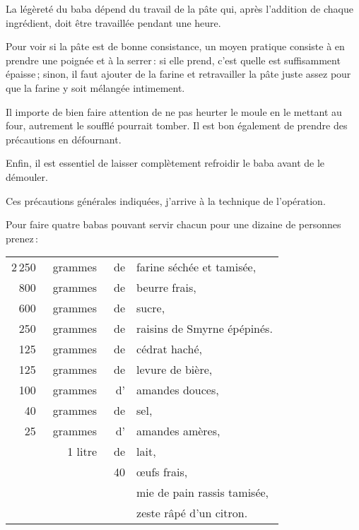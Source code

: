 La légèreté du baba dépend du travail de la pâte qui, après l'addition de
chaque ingrédient, doit être travaillée pendant une heure.

Pour voir si la pâte est de bonne consistance, un moyen pratique consiste à en
prendre une poignée et à la serrer : si elle prend, c'est quelle est
suffisamment épaisse ; sinon, il faut ajouter de la farine et retravailler la
pâte juste assez pour que la farine y soit mélangée intimement.

Il importe de bien faire attention de ne pas heurter le moule en le mettant au
four, autrement le soufflé pourrait tomber. Il est bon également de prendre des
précautions en défournant.

Enfin, il est essentiel de laisser complètement refroidir le baba avant de le
démouler.

Ces précautions générales indiquées, j'arrive à la technique de l'opération.

\medskip

Pour faire quatre babas pouvant servir chacun pour une dizaine de personnes
prenez :

\footnotesize
\begin{longtable}{rrrp{16em}}
  2 250 & grammes & de & farine séchée et tamisée,                                                        \\
    800 & grammes & de & beurre frais,                                                                    \\
    600 & grammes & de & sucre,                                                                           \\
    250 & grammes & de & raisins de Smyrne épépinés.                                                      \\
    125 & grammes & de & cédrat haché,                                                                    \\
    125 & grammes & de & levure de bière,                                                                 \\
    100 & grammes & d' & amandes douces,                                                                  \\
     40 & grammes & de & sel,                                                                             \\
     25 & grammes & d' & amandes amères,                                                                  \\
        & 1 litre & de & lait,                                                                            \\
        &         & 40 & œufs frais,                                                                      \\
        &         &    & mie de pain rassis tamisée,                                                      \\
        &         &    & zeste râpé d'un citron.                                                          \\
\end{longtable}
\normalsize

